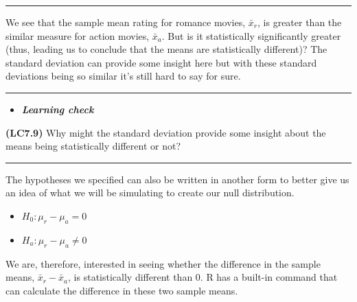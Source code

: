 \documentclass[]{tufte-book}
\newenvironment{Shaded}{\begin{snugshade}}{\end{snugshade}}
\newcommand{\KeywordTok}[1]{\textcolor[rgb]{0.13,0.29,0.53}{\textbf{{#1}}}}
\newcommand{\DataTypeTok}[1]{\textcolor[rgb]{0.13,0.29,0.53}{{#1}}}
\newcommand{\StringTok}[1]{\textcolor[rgb]{0.31,0.60,0.02}{{#1}}}
\newcommand{\NormalTok}[1]{{#1}}
\providecommand{\tightlist}{%
  \setlength{\itemsep}{0pt}\setlength{\parskip}{0pt}}
\newenvironment{rmdblock}[1]
  {\begin{shaded*}
  \begin{itemize}
  \renewcommand{\labelitemi}{
    \raisebox{-.7\height}[0pt][0pt]{
    }
  }
  \item
  }
  {
  \end{itemize}
  \end{shaded*}
  }
\newenvironment{learncheck}
  {\begin{rmdblock}{warning}}
  {\end{rmdblock}}
\begin{document}
\begin{center}\rule{\linewidth}{\linethickness}\end{center}

We see that the sample mean rating for romance movies, \(\bar{x}_{r}\),
is greater than the similar measure for action movies, \(\bar{x}_a\).
But is it statistically significantly greater (thus, leading us to
conclude that the means are statistically different)? The standard
deviation can provide some insight here but with these standard
deviations being so similar it's still hard to say for sure.

\begin{center}\rule{\linewidth}{\linethickness}\end{center}\begin{learncheck}
\textbf{\emph{Learning check}}
\end{learncheck}

\textbf{(LC7.9)} Why might the standard deviation provide some insight
about the means being statistically different or not?

\begin{center}\rule{\linewidth}{\linethickness}\end{center}

The hypotheses we specified can also be written in another form to
better give us an idea of what we will be simulating to create our null
distribution.

\begin{itemize}
\tightlist
\item
  \(H_0: \mu_r - \mu_a = 0\)
\item
  \(H_a: \mu_r - \mu_a \ne 0\)
\end{itemize}

We are, therefore, interested in seeing whether the difference in the
sample means, \(\bar{x}_r - \bar{x}_a\), is statistically different than
0. R has a built-in command that can calculate the difference in these
two sample means.

\begin{Shaded}
\end{Shaded}
\end{document}
